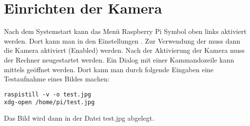 %
%
%





\section{Einrichten der Kamera}

Nach dem Systemstart kann das  Menü Raspberry Pi 
Symbol oben links aktiviert werden. Dort kann man in den Einstellungen . Zur Verwendung der muss dann die Kamera aktiviert (Enabled) werden. Nach der Aktivierung der Kamera muss der Rechner neugestartet werden. Ein Dialog mit einer Kammandozeile kann mittels  geöffnet werden. Dort kann man durch folgende Eingaben eine Testaufnahme eines Bildes machen:

\begin{lstlisting}
raspistill -v -o test.jpg
xdg-open /home/pi/test.jpg
\end{lstlisting}

Das Bild wird dann in der Datei test.jpg abgelegt.


